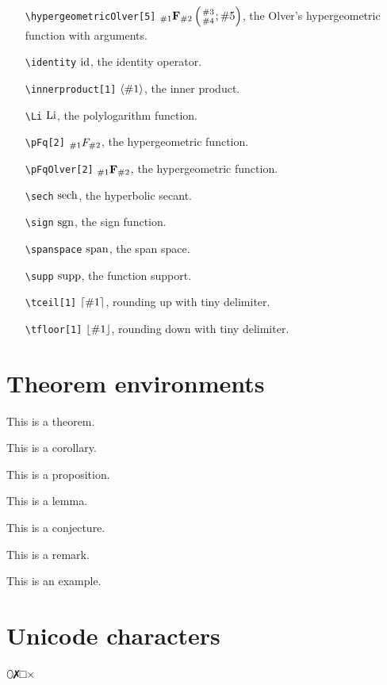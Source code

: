 \documentclass{article}
\begin{document}
\begin{itemize}
    \item[\texttt{\textbackslash hypergeometricOlver[5]}] $\hypergeometricOlver{\#1}{\#2}{\#3}{\#4}{\#5}$, the Olver's hypergeometric function with arguments.
    \item[\texttt{\textbackslash identity}] $\operatorname{id}$, the identity operator.
    \item[\texttt{\textbackslash innerproduct[1]}] $\left\langle{\#1}\right\rangle$, the inner product.
    \item[\texttt{\textbackslash Li}] $\operatorname{Li}$, the polylogarithm function.
    \item[\texttt{\textbackslash pFq[2]}] ${}_{\#1}F_{\#2}$, the hypergeometric function.
    \item[\texttt{\textbackslash pFqOlver[2]}] ${}_{\#1}\mathbf{F}_{\#2}$, the hypergeometric function.
    \item[\texttt{\textbackslash sech}] $\operatorname{sech}$, the hyperbolic secant.
    \item[\texttt{\textbackslash sign}] $\operatorname{sgn}$, the sign function.
    \item[\texttt{\textbackslash spanspace}] $\operatorname{span}$, the span space.
    \item[\texttt{\textbackslash supp}] $\operatorname{supp}$, the function support.
    \item[\texttt{\textbackslash tceil[1]}] ${\lceil{\#1}\rceil}$, rounding up with tiny delimiter.
    \item[\texttt{\textbackslash tfloor[1]}] ${\lfloor{\#1}\rfloor}$, rounding down with tiny delimiter.
\end{itemize}

\section{Theorem environments}
\begin{theorem}
    This is a theorem.
\end{theorem}
\begin{corollary}
    This is a corollary.
\end{corollary}
\begin{proposition}
    This is a proposition.
\end{proposition}
\begin{lemma}
    This is a lemma.
\end{lemma}
\begin{conjecture}
    This is a conjecture.
\end{conjecture}

\begin{remark}
    This is a remark.
\end{remark}

\begin{example}
    This is an example.
\end{example}

\section{Unicode characters}
⬯✗□×

\nocite{*}


\end{document}
